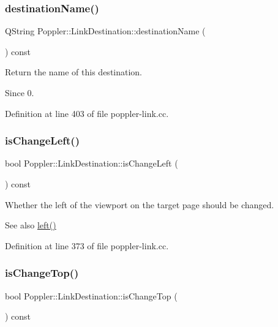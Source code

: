 \subsubsection{\texorpdfstring{destination\+Name()}{destinationName()}}
{\footnotesize\ttfamily Q\+String Poppler\+::\+Link\+Destination\+::destination\+Name (\begin{DoxyParamCaption}{ }\end{DoxyParamCaption}) const}

Return the name of this destination.

\begin{DoxySince}{Since}
0. 
\end{DoxySince}


Definition at line 403 of file poppler-\/link.\+cc.

\mbox{\label{class_poppler_1_1_link_destination_a523f8bfa4ae35647d2c00f14ca6bca5f}} 
\subsubsection{\texorpdfstring{is\+Change\+Left()}{isChangeLeft()}}
{\footnotesize\ttfamily bool Poppler\+::\+Link\+Destination\+::is\+Change\+Left (\begin{DoxyParamCaption}{ }\end{DoxyParamCaption}) const}

Whether the left of the viewport on the target page should be changed.

\begin{DoxySeeAlso}{See also}
\hyperlink{class_poppler_1_1_link_destination_a408de2b77a52aead8f1782ad464c8e3e}{left()} 
\end{DoxySeeAlso}


Definition at line 373 of file poppler-\/link.\+cc.

\mbox{\label{class_poppler_1_1_link_destination_a477b631b2f1c8bb36813ff49776d331f}} 
\subsubsection{\texorpdfstring{is\+Change\+Top()}{isChangeTop()}}
{\footnotesize\ttfamily bool Poppler\+::\+Link\+Destination\+::is\+Change\+Top (\begin{DoxyParamCaption}{ }\end{DoxyParamCaption}) const}

